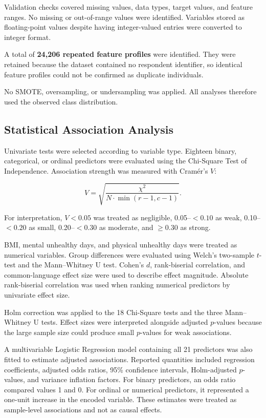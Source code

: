 \documentclass[pdflatex,sn-basic,Numbered]{sn-jnl}
\begin{document}
Validation checks covered missing values, data types, target values, and
feature ranges.
No missing or out-of-range values were identified.
Variables stored as floating-point values despite having integer-valued
entries were converted to integer format.

A total of \textbf{24,206 repeated feature profiles} were identified.
They were retained because the dataset contained no respondent identifier,
so identical feature profiles could not be confirmed as duplicate
individuals.

No SMOTE, oversampling, or undersampling was applied.
All analyses therefore used the observed class distribution.


\subsection{Statistical Association Analysis}
\label{subsec:stats}

Univariate tests were selected according to variable type.
Eighteen binary, categorical, or ordinal predictors were evaluated using
the Chi-Square Test of Independence.
Association strength was measured with Cram{\'e}r's $V$:

\begin{equation}
V =
\sqrt{
\frac{\chi^2}
{N \cdot \min(r-1,c-1)}
}.
\end{equation}

For interpretation, $V<0.05$ was treated as negligible,
0.05--$<0.10$ as weak,
0.10--$<0.20$ as small,
0.20--$<0.30$ as moderate,
and $\geq0.30$ as strong.

BMI, mental unhealthy days, and physical unhealthy days were treated as
numerical variables.
Group differences were evaluated using Welch's two-sample $t$-test and the
Mann--Whitney U test.
Cohen's $d$, rank-biserial correlation, and common-language effect size
were used to describe effect magnitude.
Absolute rank-biserial correlation was used when ranking numerical
predictors by univariate effect size.

Holm correction was applied to the 18 Chi-Square tests and the three
Mann--Whitney U tests.
Effect sizes were interpreted alongside adjusted $p$-values because the
large sample size could produce small $p$-values for weak associations.

A multivariable Logistic Regression model containing all 21 predictors was
also fitted to estimate adjusted associations.
Reported quantities included regression coefficients, adjusted odds
ratios, 95\% confidence intervals, Holm-adjusted $p$-values, and variance
inflation factors.
For binary predictors, an odds ratio compared values 1 and 0.
For ordinal or numerical predictors, it represented a one-unit increase in
the encoded variable.
These estimates were treated as sample-level associations and not as
causal effects.
\end{document}
